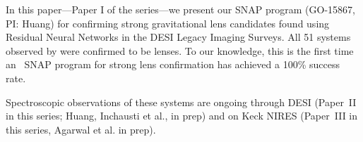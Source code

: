 
In this paper---Paper I of the \ed{\projname} series---we present our \HST SNAP program (GO-15867, PI: Huang) for confirming strong gravitational lens candidates found using Residual Neural Networks in the DESI Legacy Imaging Surveys.
All 51 systems observed by \hst were confirmed to be lenses.
To our knowledge, this is the first time an \hst~SNAP program for strong lens confirmation has achieved a 100\% success rate.

Spectroscopic observations of these systems are ongoing through DESI (Paper~II in this series; Huang, Inchausti et al., in prep) and on Keck NIRES (Paper~III in this series, Agarwal et al. in prep).

